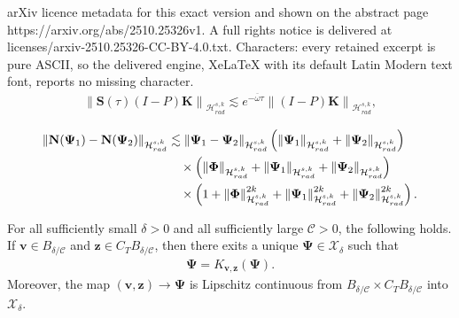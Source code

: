 \documentclass[10pt,a4paper]{amsart}
\newcommand{\HH}{\mathcal{H}}
\newcommand{\norm}[1]{\left\|#1\right\|}
\begin{document}
arXiv licence metadata for this exact version and shown on the abstract page https://arxiv.org/abs/2510.25326v1. A full rights notice is delivered at licenses/arxiv-2510.25326-CC-BY-4.0.txt. Characters: every retained excerpt is pure ASCII, so the delivered engine, XeLaTeX with its default Latin Modern text font, reports no missing character.
    \begin{align}\label{decay_semigroup}
		\norm{\mathbf{S}(\tau)(I-P)\mathbf{K}}_{\HH_{rad}^{s,k}}\lesssim e^{-\overline{\omega}\tau} \norm{(I-P)\mathbf{K}}_{\HH_{rad}^{s,k}},
	\end{align}

	\begin{align}\label{estimate_nonlinearity_selfsimilar}
		\norm{\mathbf{N}(\mathbf{\Psi}_1)-\mathbf{N}(\mathbf{\Psi}_2)}_{\HH_{rad}^{s,k}}&\lesssim \norm{\mathbf{\Psi}_1-\mathbf{\Psi}_2}_{\HH_{rad}^{s,k}}\left(\norm{\mathbf{\Psi}_1}_{\HH_{rad}^{s,k}}+\norm{\mathbf{\Psi}_2}_{\HH_{rad}^{s,k}}\right)\\ & \quad \times\left(\norm{\mathbf{\Phi}}_{\HH_{rad}^{s,k}}+\norm{\mathbf{\Psi}_1}_{\HH_{rad}^{s,k}}+\norm{\mathbf{\Psi}_2}_{\HH_{rad}^{s,k}}\right)\notag\\ &\quad  \times \left(1+\norm{\mathbf{\Phi}}_{\HH_{rad}^{s,k}}^{2k}+\norm{\mathbf{\Psi}_1}_{\HH_{rad}^{s,k}}^{2k}+\norm{\mathbf{\Psi}_2}_{\HH_{rad}^{s,k}}^{2k}\right).\notag
	\end{align}

	\begin{lemma}\label{well-posed_system_stabilized}
		For all sufficiently small $\delta>0$ and all sufficiently large $\mathcal{C}>0$, the
		following holds. If $\mathbf{v}\in B_{{\delta}/{\mathcal{C}}}$ and $\mathbf{z}\in C_{T}B_{\delta/\mathcal{C}}$, then there exits a unique $\mathbf{\Psi}  \in \mathcal{X}_{\delta}$ such that
        \begin{align*}
            \mathbf{\Psi}=K_{\mathbf{v},\mathbf{z}}(\mathbf{\Psi}).
        \end{align*}
		Moreover, the map $(\mathbf{v},\mathbf{z})\rightarrow \mathbf{\Psi}$ is Lipschitz continuous from $B_{\delta/\mathcal{C}}\times C_{T}B_{\delta/\mathcal{C}}$ into $\mathcal{X}_{\delta}$.
	\end{lemma}
\end{document}
